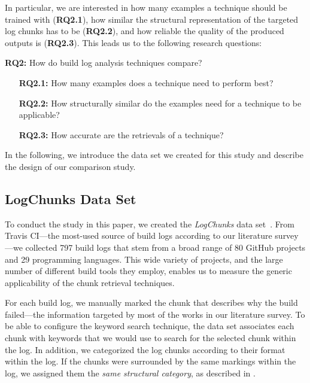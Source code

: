 In particular, we are interested in how many examples a technique
should be trained with (\textbf{RQ2.1}),
how similar the structural representation of the targeted log chunks
has to be (\textbf{RQ2.2}), and how reliable the quality of the
produced outputs is (\textbf{RQ2.3}).
This leads us to the following research questions:

\begin{simplebox}[minipage boxed title*=-1.5cm,
attach boxed title to top center={yshift=-6mm}]
{\textbf{RQ2:} How do build log analysis techniques compare?}
\begin{itemize}[leftmargin=1.2cm]
  \item[\textbf{RQ2.1:}] How many examples does a technique need to
  perform best?
  \item[\textbf{RQ2.2:}] How structurally similar do the examples
  need for a technique to be applicable?
  \item[\textbf{RQ2.3:}] How accurate are the retrievals of a technique?
\end{itemize}
\end{simplebox}

In the following, we introduce the data set we created for this
study and describe the design of our comparison study.

\subsection{LogChunks Data Set}
\label{sec:logchunks}
To conduct the study in this paper, we created the
\emph{LogChunks} data set~\cite{brandt2020logchunks}.
From Travis CI---the most-used source of build logs
according to our literature survey---we collected
797 build logs that
stem from a broad range of 80 GitHub projects and 29
programming languages.
This wide variety of projects, and the large number of different build
tools they employ, enables us to measure the generic
applicability of the chunk retrieval techniques.

For each build log, we manually marked
the chunk that describes why the build
failed---the information targeted by most of the works in our
literature survey.
To be able to configure the keyword search technique,
the data set associates each chunk with keywords that we
would use to search for the selected chunk within the log.
In
addition, we categorized the log chunks according to their format
within the log.
If the chunks were surrounded by the same markings
within the log, we assigned them the \emph{same structural category},
as described in .

